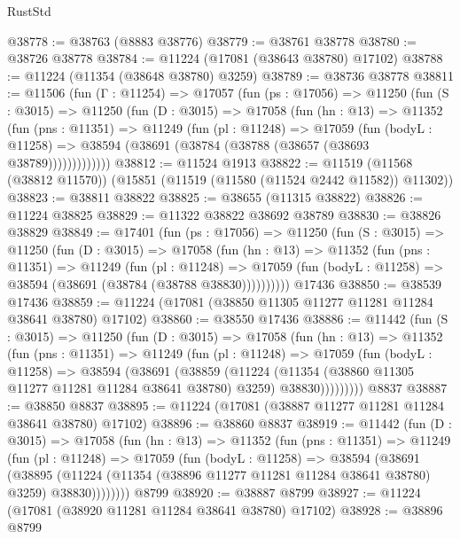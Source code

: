\begin{lexlean}{RustStd}
\begin{coremodule}
@38778 := @38763 (@8883 @38776)
@38779 := @38761 @38778
@38780 := @38726 @38778
@38784 := @11224 (@17081 (@38643 @38780) @17102)
@38788 := @11224 (@11354 (@38648 @38780) @3259)
@38789 := @38736 @38778
@38811 := @11506
    (fun (Γ : @11254) =>
    @17057
      (fun (ps : @17056) =>
      @11250
        (fun (S : @3015) =>
        @11250
          (fun (D : @3015) =>
          @17058
            (fun (hn : @13) =>
            @11352
              (fun (pns : @11351) =>
              @11249
                (fun (pl : @11248) =>
                @17059
                  (fun (bodyL : @11258) =>
                  @38594 (@38691 (@38784 (@38788 (@38657 (@38693 @38789)))))))))))))
@38812 := @11524 @1913
@38822 := @11519 (@11568 (@38812 @11570)) (@15851 (@11519 (@11580 (@11524 @2442 @11582)) @11302))
@38823 := @38811 @38822
@38825 := @38655 (@11315 @38822)
@38826 := @11224 @38825
@38829 := @11322 @38822 @38692 @38789
@38830 := @38826 @38829
@38849 := @17401
    (fun (ps : @17056) =>
    @11250
      (fun (S : @3015) =>
      @11250
        (fun (D : @3015) =>
        @17058
          (fun (hn : @13) =>
          @11352
            (fun (pns : @11351) =>
            @11249
              (fun (pl : @11248) =>
              @17059 (fun (bodyL : @11258) => @38594 (@38691 (@38784 (@38788 @38830))))))))))
    @17436
@38850 := @38539 @17436
@38859 := @11224 (@17081 (@38850 @11305 @11277 @11281 @11284 @38641 @38780) @17102)
@38860 := @38550 @17436
@38886 := @11442
    (fun (S : @3015) =>
    @11250
      (fun (D : @3015) =>
      @17058
        (fun (hn : @13) =>
        @11352
          (fun (pns : @11351) =>
          @11249
            (fun (pl : @11248) =>
            @17059
              (fun (bodyL : @11258) =>
              @38594
                (@38691
                  (@38859
                    (@11224
                      (@11354 (@38860 @11305 @11277 @11281 @11284 @38641 @38780) @3259)
                      @38830)))))))))
    @8837
@38887 := @38850 @8837
@38895 := @11224 (@17081 (@38887 @11277 @11281 @11284 @38641 @38780) @17102)
@38896 := @38860 @8837
@38919 := @11442
    (fun (D : @3015) =>
    @17058
      (fun (hn : @13) =>
      @11352
        (fun (pns : @11351) =>
        @11249
          (fun (pl : @11248) =>
          @17059
            (fun (bodyL : @11258) =>
            @38594
              (@38691
                (@38895
                  (@11224 (@11354 (@38896 @11277 @11281 @11284 @38641 @38780) @3259) @38830))))))))
    @8799
@38920 := @38887 @8799
@38927 := @11224 (@17081 (@38920 @11281 @11284 @38641 @38780) @17102)
@38928 := @38896 @8799

\end{coremodule}
\end{lexlean}
